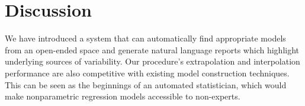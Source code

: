 \documentclass[letterpaper]{article}
\newcommand{\procedurename}{ABCD}
\begin{document}
\section{Discussion}

We have introduced a system that can automatically find appropriate models from an open-ended space and generate natural language reports which highlight underlying sources of variability.
Our procedure's extrapolation and interpolation performance are also competitive with existing model construction techniques.
This can be seen as the beginnings of an automated statistician, which would make nonparametric regression models accessible to non-experts.





\end{document}
